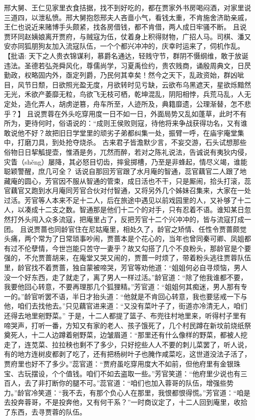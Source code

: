 \documentclass[12pt,oneside]{book}
\begin{document}
邢大舅、王仁见家里衣食拮据，找不到好吃的，都在贾家外书房喝闷酒，对家里说三道四，以泄私愤。邢大舅抱怨邢夫人吝啬小气，看钱太重，不肯施舍济助亲戚，王仁也说近来赌博手头颇紧，找各房借钱，都不肯借，两人成日牢骚不断。
且说贾环同赵姨娘离开贾府，与贼寇为伍，仗着身上积得财物，广招人马。司棋、潘又安亦同狐朋狗友加入流寇队伍，一个个都兴冲冲的，庆幸时运来了，伺机作乱。【批语: 天下之人贵衣锦谋利，慕爵名通达，轻贱守节，群阴不慑纲维，敢于放诞违法。圣德若弘尧舜风化，尊儒尚学，习夏禹俭约，贵农贱商，诵殷周典文，日昃勤政，权略固内外，亟定列爵，乃民何其幸矣！然今之天下，乱政资始，群凶呲目，风节日颓，日欲照光盈无度，月欲转时见亏缺，云欲布乌黑遮天，星欲烁黯然无光，禾欲产萎靡无粒，鸟欲飞无枝可栖，乾坤混乱，阴阳相悖，兵荒马乱，人无定处，造化弄人，胡虏逆篡，舟车所至，人迹所及，典籍靡遗，公理渐替，怎不悲乎？】
且说贾蓉在外头吃穿用度一日不如一日，外面局势又乱如蓬草，此时不有所为，更待何时，俗语说的：“成则王侯败则寇，待他将来争战获得功名，又有谁敢说他不好？故把旧日学堂里的顽劣子弟都纠集一处，振臂一呼，在庙宇庵堂集中，打磨刀具，到处抢夺烧杀。
古来君子皆澹默少言，不妄交游，石头试想那些俗物日日挈觚提壶，惟酒是务，兀然而醉，若对之陈礼说法，告诚说有夷狄内侵，灾眚（shěng）屡降，其必怒目切齿，摔瓮掷槽，乃至是非蜂起，情尽义竭，谁能聪颖警醒，庶几可全？
话说自那回芳官跟了水月庵的智通，蕊官藕官二人跟了地藏庵的圆心，芳官因不服从智通的管束，成日活也不干，只是厮闹，拾头打滚，蕊官藕官又跑到水月庵同芳官合伙对付智通，又将另外几个姊妹召集来，大家在一处过活。芳官等人本来不足十二人，后在旅途中遇见以前戏园里的人，又补够了十二人，以凑成十二支之数。智通那是他们十二个的对手，只有忍着不语。谁知某日忽然打外头闯入众多流寇，把庵里占了，反把芳官十二个兴冲冲的，皆与流寇打成一团。
且说贾蔷也同龄官住在尼姑庵里，相处久了，龄官之矫情、任性令贾蔷颇觉头痛，两个常为了日常琐事吵闹，贾蔷本是个花心的，当年也曾同秦可卿、凤姐都有过不伦孽情，今世岂能只苦守一妻乎？故又勾搭了几个不良粉头，那龄官是个要强的，不允贾蔷胡来，在庵堂又哭又闹的，贾蔷一时烦了，带着粉头逃往贾蓉队伍里，龄官找不着贾蔷，独自蒙被啼哭，芳官等劝他道：“姐姐何必自寻烦恼，男人没一个好东西，走了就走了，离了男人一样过活。”龄官道：“除了他我谁都不要，我要他回心转意，不要再理那几个狐狸精。”芳官道：“姐姐何其痴迷，男人那有专一的。”龄官听罢不语，半日才抬头道：“他就是不肯回心转意，我也要惩戒一下与他，咱们去找他去。”只见藕官进来道：“又没有菜叶子了，街道亦冷清无人，咱们还得去地里剜野菜。”
于是，十二人都提了篮子、布兜往村地里来，听得村子里有啼哭声，打听一番，方知又有家的老人、孩子饿死了，几个村民蹲在新坟前烧纸祭奠死人，十二人边蹲着剜野菜，边皱眉道：“那里还有什么像样的野菜，都被人挖走了，连苋菜、拉拉秧也剩不了多少，只好挖些人人不要的刺儿菜罢了，听人说，有的地方连树皮都剥了吃了，还有把杨树叶子也腌作咸菜吃，这世道没法子活了，贾府里也好不了多少。”蕊官道：“贾府虽吃穿用度大不如前，但他府里有金银珠宝、古玩摆设，个个值钱。咱们不如去盗取一些。”芳官笑道：“他府里少说也有三百人，去了非打断你的腿不可。”蕊官道：“咱们也加入蓉哥的队伍，增强些势力。”龄官冷笑道：“我不去，有那个负心人在那里，我恨都恨得慌。”芳官道：“咱是去投奔蓉哥，不是投奔他，又有何干系？”一时商议定了，十二人回到庵里，收拾了东西，去寻贾蓉的队伍。
\end{document}
